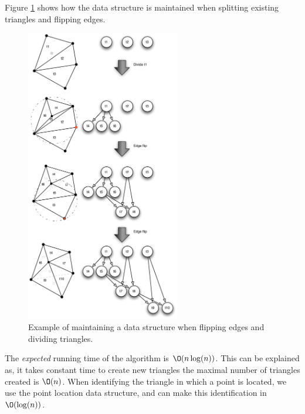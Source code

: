 \documentclass[10pt]{article}
\begin{document}
Figure \ref{fig9} shows how the data structure is maintained when splitting existing triangles and flipping edges.
\begin{figure}[ht]
\centering
\includegraphics[width=0.6\textwidth]{figures/fig9.pdf}
\caption{Example of maintaining a data structure when flipping edges and dividing triangles.}
\label{fig9}
\end{figure}

The \emph{expected} running time of the algorithm is $\O(n\log(n))$. This can be explained as, it takes constant time to create new triangles the maximal number of triangles created is $\O(n)$. When identifying the triangle in which a point is located, we use the point location data structure, and can make this identification in $\O(\log(n))$.



                                       
\end{document}
